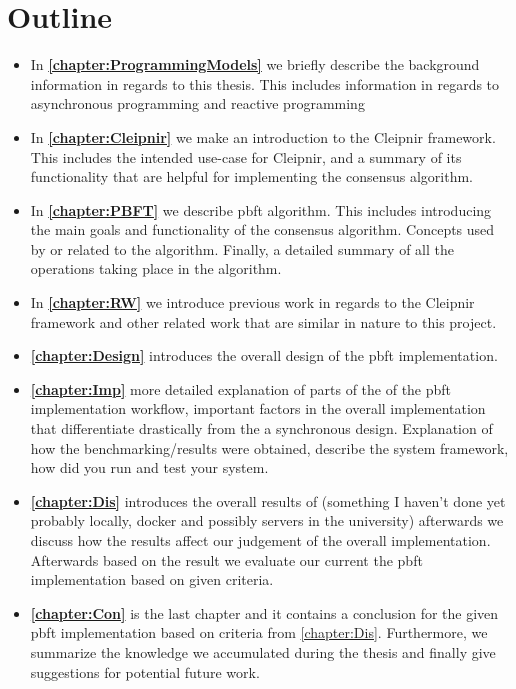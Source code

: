 \section{Outline}
\begin{itemize}
\item In \textbf{\autoref{chapter:ProgrammingModels}} we briefly describe the background information in regards to this thesis. This includes information in regards to asynchronous programming and reactive programming

\item In \textbf{\autoref{chapter:Cleipnir}} we make an introduction to the Cleipnir framework. This includes the intended use-case for Cleipnir, and a summary of its functionality that are helpful for implementing the consensus algorithm. 

\item In \textbf{\autoref{chapter:PBFT}} we describe \ac{pbft} algorithm. This includes introducing the main goals and functionality of the consensus algorithm. Concepts used by or related to the algorithm. Finally, a detailed summary of all the operations taking place in the algorithm.

\item In \textbf{\autoref{chapter:RW}} we introduce previous work in regards to the Cleipnir framework and other related work that are similar in nature to this project.

\item \textbf{\autoref{chapter:Design}} introduces the overall design of the \ac{pbft} implementation.

\item \textbf{\autoref{chapter:Imp}} more detailed explanation of parts of the of the \ac{pbft} implementation workflow, important factors in the overall implementation that differentiate drastically from the a synchronous design. Explanation of how the benchmarking/results were obtained, describe the system framework, how did you run and test your system.

\item \textbf{\autoref{chapter:Dis}} introduces the overall results of (something I haven't done yet probably locally, docker and possibly servers in the university) afterwards we discuss how the results affect our judgement of the overall implementation. Afterwards based on the result we evaluate our current the \ac{pbft} implementation based on given criteria.

\item \textbf{\autoref{chapter:Con}} is the last chapter and it contains a conclusion for the given \ac{pbft} implementation based on criteria from \autoref{chapter:Dis}. Furthermore, we summarize the knowledge we accumulated during the thesis and finally give suggestions for potential future work.
\end{itemize}